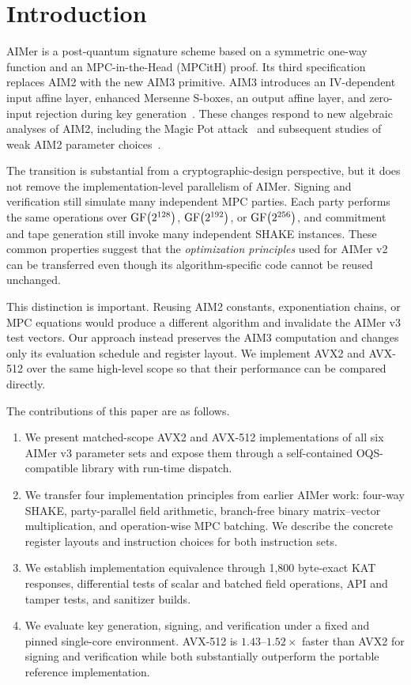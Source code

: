 \section{Introduction}
\label{sec:introduction}

AIMer is a post-quantum signature scheme based on a symmetric one-way function
and an MPC-in-the-Head (MPCitH) proof.  Its third specification replaces AIM2
with the new AIM3 primitive.  AIM3 introduces an IV-dependent input affine
layer, enhanced Mersenne S-boxes, an output affine layer, and zero-input
rejection during key generation~\cite{cho2026aimer3}.  These changes respond to
new algebraic analyses of AIM2, including the Magic Pot
attack~\cite{biryukov2026magic} and subsequent studies of weak AIM2 parameter
choices~\cite{sun2025high}.

The transition is substantial from a cryptographic-design perspective, but it
does not remove the implementation-level parallelism of AIMer.  Signing and
verification still simulate many independent MPC parties.  Each party performs
the same operations over $\operatorname{GF}\!\left(2^{128}\right)$, $\operatorname{GF}\!\left(2^{192}\right)$, or $\operatorname{GF}\!\left(2^{256}\right)$, and
commitment and tape generation still invoke many independent SHAKE instances.
These common properties suggest that the \emph{optimization principles} used
for AIMer v2 can be transferred even though its algorithm-specific code cannot
be reused unchanged.

This distinction is important.  Reusing AIM2 constants, exponentiation chains,
or MPC equations would produce a different algorithm and invalidate the AIMer
v3 test vectors.  Our approach instead preserves the AIM3 computation and
changes only its evaluation schedule and register layout.  We implement AVX2
and AVX-512 over the same high-level scope so that their performance can be
compared directly.

The contributions of this paper are as follows.

\begin{enumerate}[label=\arabic*.,leftmargin=*]
\item We present matched-scope AVX2 and AVX-512 implementations of all six
AIMer v3 parameter sets and expose them through a self-contained
OQS-compatible library with run-time dispatch.

\item We transfer four implementation principles from earlier AIMer work:
four-way SHAKE, party-parallel field arithmetic, branch-free binary
matrix--vector multiplication, and operation-wise MPC batching.  We describe
the concrete register layouts and instruction choices for both instruction
sets.

\item We establish implementation equivalence through 1,800 byte-exact KAT
responses, differential tests of scalar and batched field operations, API and
tamper tests, and sanitizer builds.

\item We evaluate key generation, signing, and verification under a fixed and
pinned single-core environment.  AVX-512 is $1.43$--$1.52\times$ faster than
AVX2 for signing and verification while both substantially outperform the
portable reference implementation.
\end{enumerate}

